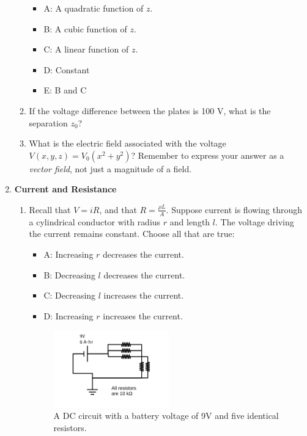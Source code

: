 \documentclass[10pt]{article}
\begin{document}
\begin{enumerate}
\begin{enumerate}
\begin{itemize}
\item A: A quadratic function of $z$.
\item B: A cubic function of $z$.
\item C: A linear function of $z$.
\item D: Constant
\item E: B and C
\end{itemize}
\item If the voltage difference between the plates is 100 V, what is the separation $z_0$? \\ \vspace{2cm}
\item What is the electric field associated with the voltage $V(x,y,z) = V_0 \left( x^2 + y^2 \right)$?  Remember to express your answer as a \textit{vector field}, not just a magnitude of a field.  \\ \vspace{2cm}
\end{enumerate}
\item \textbf{Current and Resistance}
\begin{enumerate}
\item Recall that $V = iR$, and that $R = \frac{\rho L}{A}$.  Suppose current is flowing through a cylindrical conductor with radius $r$ and length $l$.  The voltage driving the current remains constant.  Choose all that are true:
\begin{itemize}
\item A: Increasing $r$ decreases the current.
\item B: Decreasing $l$ decreases the current.
\item C: Decreasing $l$ increases the current.
\item D: Increasing $r$ increases the current.
\end{itemize}
\begin{figure}[hb]
\centering
\includegraphics[width=0.5\textwidth]{figures/circuitExample1.pdf}
\caption{\label{fig:circuit} A DC circuit with a battery voltage of 9V and five identical resistors.}

\end{figure}
\end{enumerate}
\end{enumerate}
\end{document}
